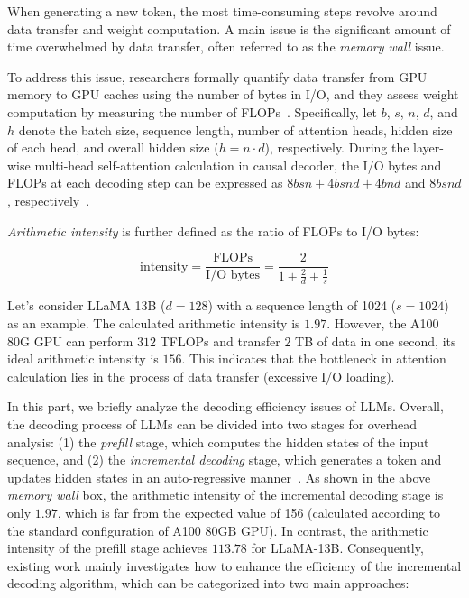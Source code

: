 \begin{center}
\begin{tcolorbox}[colback=blue!5!white,colframe=blue!55!black,width=0.48\textwidth,title={Memory Wall}]
{{When generating a new token, the most time-consuming steps  revolve around data transfer and weight computation. A main issue is the significant amount of time overwhelmed by data transfer, often referred to as the \emph{memory wall} issue.} 

\vspace{0.5em}

{To  address this issue, researchers formally quantify data transfer from GPU memory to GPU caches using the number of bytes in I/O, and they assess weight computation by measuring the number of FLOPs~\cite{Chen-blog-2023-Dissecting}. Specifically, let $b$, $s$, $n$, $d$, and $h$ denote the batch size, sequence length, number of attention heads, hidden size of each head, and overall hidden size ($h = n \cdot d$), respectively. During the layer-wise multi-head self-attention calculation in causal decoder, the I/O bytes and FLOPs at each decoding step can be expressed as $8bsn + 4bsnd + 4bnd$ and $8bsnd$, respectively~\cite{Chen-blog-2023-Dissecting}.}

\vspace{0.5em}


{\emph{Arithmetic intensity} is further defined as the ratio of FLOPs to I/O bytes:}

\begin{equation}
    \text{intensity} = \frac{\text{FLOPs}}{\text{I/O bytes}}=\frac{2}{1 + \frac{2}{d} + \frac{1}{s}}
\end{equation}

{Let's consider LLaMA 13B ($d = 128$) with a sequence length of 1024 ($s=1024$) as an  example. The calculated arithmetic intensity is $1.97$. However, the A100 80G GPU can perform $312$ TFLOPs and transfer $2$ TB of data in one second, \ie its ideal arithmetic intensity is $156$. This indicates that the bottleneck in attention calculation lies in the process of data transfer (\ie excessive I/O loading).}



}
\end{tcolorbox}
\end{center}


In this part, we briefly analyze the decoding efficiency issues of LLMs. 
{Overall, the decoding process of LLMs can be divided into two stages for overhead analysis:  (1) the \emph{prefill} stage, which computes the hidden states of the input sequence, and (2) the \emph{incremental decoding} stage, which generates a token and updates hidden states in an auto-regressive manner~\cite{Sheng-ICML-2023-FlexGen}. As shown in the above \emph{memory wall} box, the arithmetic intensity of the incremental decoding stage is only $1.97$, which is far from the expected value of 156 (calculated according to the standard configuration of A100 80GB GPU). In contrast, the arithmetic intensity of the prefill stage achieves $113.78$ for LLaMA-13B. Consequently, existing work mainly investigates how to enhance the efficiency of the incremental decoding algorithm, which can be categorized into two main approaches:}


